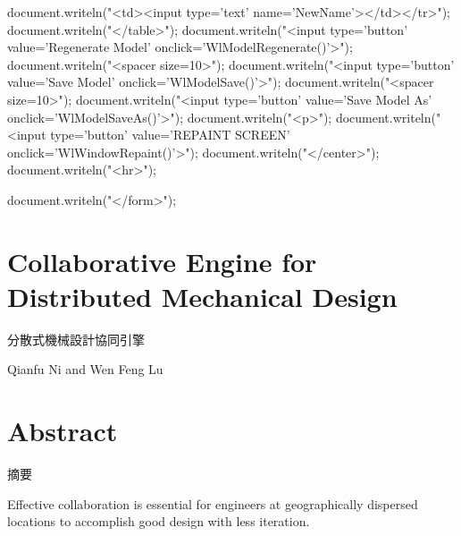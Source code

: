 \documentclass[]{article}
\newenvironment{Shaded}{}{}
\newcommand{\StringTok}[1]{\textcolor[rgb]{0.25,0.44,0.63}{{#1}}}
\newcommand{\OtherTok}[1]{\textcolor[rgb]{0.00,0.44,0.13}{{#1}}}
\newcommand{\FunctionTok}[1]{\textcolor[rgb]{0.02,0.16,0.49}{{#1}}}
\newcommand{\NormalTok}[1]{{#1}}
\begin{document}
\begin{Shaded}
\begin{Highlighting}[]
\OtherTok{document}\NormalTok{.}\FunctionTok{writeln}\NormalTok{(}\StringTok{"<td><input type='text' name='NewName'></td></tr>"}\NormalTok{);}
\OtherTok{document}\NormalTok{.}\FunctionTok{writeln}\NormalTok{(}\StringTok{"</table>"}\NormalTok{);}
\OtherTok{document}\NormalTok{.}\FunctionTok{writeln}\NormalTok{(}\StringTok{"<input type='button' value='Regenerate Model' onclick='WlModelRegenerate()'>"}\NormalTok{);}
\OtherTok{document}\NormalTok{.}\FunctionTok{writeln}\NormalTok{(}\StringTok{"<spacer size=10>"}\NormalTok{);}
\OtherTok{document}\NormalTok{.}\FunctionTok{writeln}\NormalTok{(}\StringTok{"<input type='button' value='Save Model' onclick='WlModelSave()'>"}\NormalTok{);}
\OtherTok{document}\NormalTok{.}\FunctionTok{writeln}\NormalTok{(}\StringTok{"<spacer size=10>"}\NormalTok{);}
\OtherTok{document}\NormalTok{.}\FunctionTok{writeln}\NormalTok{(}\StringTok{"<input type='button' value='Save Model As' onclick='WlModelSaveAs()'>"}\NormalTok{);}
\OtherTok{document}\NormalTok{.}\FunctionTok{writeln}\NormalTok{(}\StringTok{"<p>"}\NormalTok{);}
\OtherTok{document}\NormalTok{.}\FunctionTok{writeln}\NormalTok{(}\StringTok{"<input type='button' value='REPAINT  SCREEN' onclick='WlWindowRepaint()'>"}\NormalTok{);}
\OtherTok{document}\NormalTok{.}\FunctionTok{writeln}\NormalTok{(}\StringTok{"</center>"}\NormalTok{);}
\OtherTok{document}\NormalTok{.}\FunctionTok{writeln}\NormalTok{(}\StringTok{"<hr>"}\NormalTok{);}

\OtherTok{document}\NormalTok{.}\FunctionTok{writeln}\NormalTok{(}\StringTok{"</form>"}\NormalTok{);}
\end{Highlighting}
\end{Shaded}

\section{Collaborative Engine for Distributed Mechanical
Design}\label{collaborative-engine-for-distributed-mechanical-design}

分散式機械設計協同引擎

Qianfu Ni and Wen Feng Lu

\section{Abstract}\label{abstract}

摘要

Effective collaboration is essential for engineers at geographically
dispersed locations to accomplish good design with less iteration.
\end{document}
